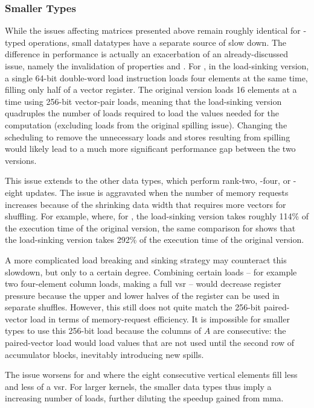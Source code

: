 \documentclass[\main/thesis.tex]{subfiles}
\begin{document}
\subsubsection{Smaller Types}
While the issues affecting  matrices presented above remain roughly identical for -typed operations, small datatypes have a separate source of slow down.
The difference in performance is actually an exacerbation of an already-discussed issue, namely the invalidation of properties  and .
For , in the load-sinking version, a single 64-bit double-word load instruction loads four  elements at the same time, filling only half of a vector register.
The original version loads 16 elements at a time using 256-bit vector-pair loads, meaning that the load-sinking version quadruples the number of loads required to load the values needed for the computation (excluding loads from the original spilling issue).
Changing the scheduling to remove the unnecessary loads and stores resulting from spilling would likely lead to a much more significant performance gap between the two versions.

This issue extends to the other data types, which perform rank-two, -four, or -eight updates.
The issue is aggravated when the number of memory requests increases because of the shrinking data width that requires more vectors for shuffling.
For example, where, for , the load-sinking version takes roughly 114\% of the execution time of the original version, the same comparison for  shows that the load-sinking version takes 292\% of the execution time of the original version.

A more complicated load breaking and sinking strategy may counteract this slowdown, but only to a certain degree.
Combining certain loads -- for example two four-element  column loads, making a full \gls{vsr} -- would decrease register pressure because the upper and lower halves of the register can be used in separate shuffles.
However, this still does not quite match the 256-bit paired-vector load in terms of memory-request efficiency.
It is impossible for smaller types to use this 256-bit load because the columns of $A$ are consecutive: the paired-vector load would load values that are not used until the second row of accumulator blocks, inevitably introducing new spills.

The issue worsens for  and  where the eight consecutive vertical elements fill less and less of a \gls{vsr}.
For larger kernels, the smaller data types thus imply a increasing number of loads, further diluting the speedup gained from \gls{mma}.
\end{document}
